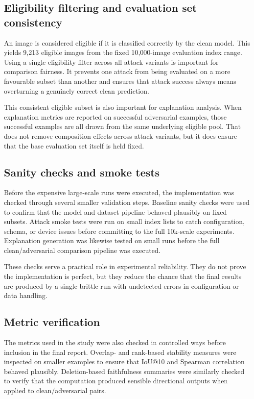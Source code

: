 \subsection{Eligibility filtering and evaluation set consistency}
An image is considered eligible if it is classified correctly by the clean model.
This yields 9{,}213 eligible images from the fixed 10{,}000-image evaluation index range.
Using a single eligibility filter across all attack variants is important for comparison fairness.
It prevents one attack from being evaluated on a more favourable subset than another and ensures that attack success always means overturning a genuinely correct clean prediction.

This consistent eligible subset is also important for explanation analysis.
When explanation metrics are reported on successful adversarial examples, those successful examples are all drawn from the same underlying eligible pool.
That does not remove composition effects across attack variants, but it does ensure that the base evaluation set itself is held fixed.

\subsection{Sanity checks and smoke tests}
Before the expensive large-scale runs were executed, the implementation was checked through several smaller validation steps.
Baseline sanity checks were used to confirm that the model and dataset pipeline behaved plausibly on fixed subsets.
Attack smoke tests were run on small index lists to catch configuration, schema, or device issues before committing to the full 10k-scale experiments.
Explanation generation was likewise tested on small runs before the full clean/adversarial comparison pipeline was executed.

These checks serve a practical role in experimental reliability.
They do not prove the implementation is perfect, but they reduce the chance that the final results are produced by a single brittle run with undetected errors in configuration or data handling.

\subsection{Metric verification}
The metrics used in the study were also checked in controlled ways before inclusion in the final report.
Overlap- and rank-based stability measures were inspected on smaller examples to ensure that IoU@10 and Spearman correlation behaved plausibly.
Deletion-based faithfulness summaries were similarly checked to verify that the computation produced sensible directional outputs when applied to clean/adversarial pairs.

